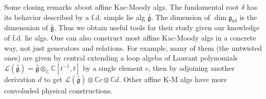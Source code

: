 \documentclass[11pt, letterpaper]{article}
\theoremstyle{plain}
\newcommand{\gc}{\overset{\circ}{\mathfrak{g}}}
\begin{document}
Some closing remarks about affine Kac-Moody algs. The fundamental root $\delta $ has its behavior described by a f.d. simple lie alg $\gc$. The dimension of $\dim \mathfrak{g} _{k\delta } $ is the dimensnion of $\gc$. Thus we obtain useful tools for their study given our knowledge of f.d. lie algs. One can also construct most affine Kac-Moody algs in a concrete way, not just generators and relations. For example, many of them (the untwisted ones) are given by central extending a loop algeba of Laurant polynomials $\mathcal{L} (\gc)=\gc\otimes _\mathbb{C} \mathbb{C} [t^{-1} ,t]$ by a single element $c$, then by adjoining another derivation $d$ to get $\mathcal{L} (\gc)\otimes \mathbb{C} c\otimes \mathbb{C} d$. Other affine K-M algs have more convoluded physical constructions.



\end{document}
